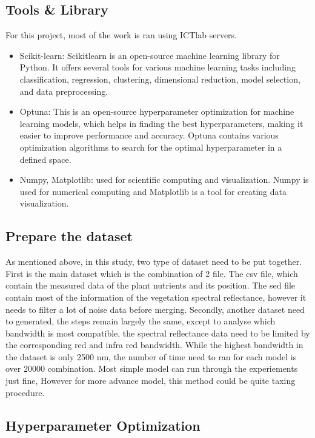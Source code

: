 \subsection{Tools \& Library}
For this project, most of the work is ran using ICTlab servers.
\begin{itemize}
    \item 
    Scikit-learn: Scikitlearn is an open-source machine learning library for Python. It offers several tools for various machine learning tasks including classification, regression, clustering, dimensional reduction, model selection, and data preprocessing. 
    \item 
    Optuna: This is an open-source hyperparameter optimization for machine learning models, which helps in finding the best hyperparameters, making it easier to improve performance and accuracy. Optuna contains various optimization algorithms to search for the optimal hyperparameter in a defined space.
    \item
    Numpy, Matplotlib: used for scientific computing and visualization. Numpy is used for numerical computing and Matplotlib is a tool for creating data visualization.
\end{itemize}

\subsection{Prepare the dataset}
As mentioned above, in this study, two type of dataset need to be put together. First is the main dataset which is the combination of 2 file. The csv file, which contain the measured data of the plant nutrients and its position. The sed file contain most of the information of the vegetation spectral reflectance, however it needs to filter a lot of noise data before merging.
Secondly, another dataset need to generated, the steps remain largely the same, except to analyse which bandwidth is most compatible, the spectral reflectance data need to be limited by the corresponding red and infra red bandwidth. While the highest bandwidth in the dataset is only 2500 nm, the number of time need to ran for each model is over 20000 combination. Most simple model can run through the experiements just fine, However for more advance model, this method could be quite taxing procedure.

\subsection{Hyperparameter Optimization}

